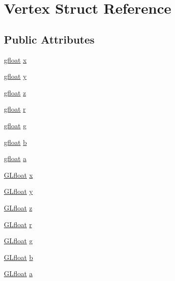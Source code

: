 \hypertarget{struct_vertex}{}\section{Vertex Struct Reference}
\label{struct_vertex}
\subsection*{Public Attributes}
\begin{DoxyCompactItemize}
\item 
\mbox{\hyperlink{opengl_2triangles_8cpp_a9f8f89ff3e07b5fc534327016b4ba7b4}{gfloat}} \mbox{\hyperlink{struct_vertex_ae02cfb84a3e8f33a2a94a8d3b3798aac}{x}}
\item 
\mbox{\hyperlink{opengl_2triangles_8cpp_a9f8f89ff3e07b5fc534327016b4ba7b4}{gfloat}} \mbox{\hyperlink{struct_vertex_a53f2719389e21b4e931282336d3817aa}{y}}
\item 
\mbox{\hyperlink{opengl_2triangles_8cpp_a9f8f89ff3e07b5fc534327016b4ba7b4}{gfloat}} \mbox{\hyperlink{struct_vertex_acda9f16691b233ed0d8db0f12079f7e9}{z}}
\item 
\mbox{\hyperlink{opengl_2triangles_8cpp_a9f8f89ff3e07b5fc534327016b4ba7b4}{gfloat}} \mbox{\hyperlink{struct_vertex_a0874a00d75d70c7b1e0b57a85297ee3b}{r}}
\item 
\mbox{\hyperlink{opengl_2triangles_8cpp_a9f8f89ff3e07b5fc534327016b4ba7b4}{gfloat}} \mbox{\hyperlink{struct_vertex_aaf212b0ecbcbf9c0367ddae30461fd03}{g}}
\item 
\mbox{\hyperlink{opengl_2triangles_8cpp_a9f8f89ff3e07b5fc534327016b4ba7b4}{gfloat}} \mbox{\hyperlink{struct_vertex_a0a5270835c4e3bcce9bfc9ba4a069bbb}{b}}
\item 
\mbox{\hyperlink{opengl_2triangles_8cpp_a9f8f89ff3e07b5fc534327016b4ba7b4}{gfloat}} \mbox{\hyperlink{struct_vertex_a885e6834f58550a4e1c1339a171f42f2}{a}}
\item 
\mbox{\hyperlink{glad_8h_a836cf6377099e88abf24c255b5b0ac52}{G\+Lfloat}} \mbox{\hyperlink{struct_vertex_ae02cfb84a3e8f33a2a94a8d3b3798aac}{x}}
\item 
\mbox{\hyperlink{glad_8h_a836cf6377099e88abf24c255b5b0ac52}{G\+Lfloat}} \mbox{\hyperlink{struct_vertex_a53f2719389e21b4e931282336d3817aa}{y}}
\item 
\mbox{\hyperlink{glad_8h_a836cf6377099e88abf24c255b5b0ac52}{G\+Lfloat}} \mbox{\hyperlink{struct_vertex_acda9f16691b233ed0d8db0f12079f7e9}{z}}
\item 
\mbox{\hyperlink{glad_8h_a836cf6377099e88abf24c255b5b0ac52}{G\+Lfloat}} \mbox{\hyperlink{struct_vertex_a0874a00d75d70c7b1e0b57a85297ee3b}{r}}
\item 
\mbox{\hyperlink{glad_8h_a836cf6377099e88abf24c255b5b0ac52}{G\+Lfloat}} \mbox{\hyperlink{struct_vertex_aaf212b0ecbcbf9c0367ddae30461fd03}{g}}
\item 
\mbox{\hyperlink{glad_8h_a836cf6377099e88abf24c255b5b0ac52}{G\+Lfloat}} \mbox{\hyperlink{struct_vertex_a0a5270835c4e3bcce9bfc9ba4a069bbb}{b}}
\item 
\mbox{\hyperlink{glad_8h_a836cf6377099e88abf24c255b5b0ac52}{G\+Lfloat}} \mbox{\hyperlink{struct_vertex_a885e6834f58550a4e1c1339a171f42f2}{a}}
\end{DoxyCompactItemize}



